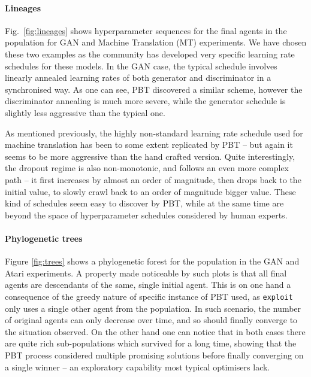 \documentclass{article} %
\newcommand{\figref}[1]{Fig.~\ref{#1}}
\newcommand{\pbtexploit}{\texttt{exploit}\xspace}
\begin{document}
\paragraph{Lineages}\label{sec:analysis_lineage}

\figref{fig:lineages} shows hyperparameter sequences for the final agents in the population for GAN and Machine Translation (MT) experiments. We have chosen these two examples as the community has developed very specific learning rate schedules for these models. In the GAN case, the typical schedule involves linearly annealed learning rates of both generator and discriminator in a synchronised way. As one can see, PBT discovered a similar scheme, however the discriminator annealing is much more severe, while the generator schedule is slightly less aggressive than the typical one. 

As mentioned previously, the highly non-standard learning rate schedule used for machine translation has been to some extent replicated by PBT -- but again it seems to be more aggressive than the hand crafted version. Quite interestingly, the dropout regime is also non-monotonic, and follows an even more complex path -- it first increases by almost an order of magnitude, then drops back to the initial value, to slowly crawl back to an order of magnitude bigger value. These kind of schedules seem easy to discover by PBT, while at the same time are beyond the space of hyperparameter schedules considered by human experts.



\paragraph{Phylogenetic trees}\label{sec:analysis_phylogenetic}

Figure \ref{fig:trees} shows a phylogenetic forest for the population in the GAN and Atari experiments. A property made noticeable by such plots is that all final agents are descendants of the same, single initial agent. This is on one hand a consequence of the greedy nature of specific instance of PBT used, as \pbtexploit only uses a single other agent from the population. In such scenario, the number of original agents can only decrease over time, and so should finally converge to the situation observed. On the other hand one can notice that in both cases there are quite rich sub-populations which survived for a long time, showing that the PBT process considered multiple promising solutions before finally converging on a single winner -- an exploratory capability most typical optimisers lack.
\end{document}
